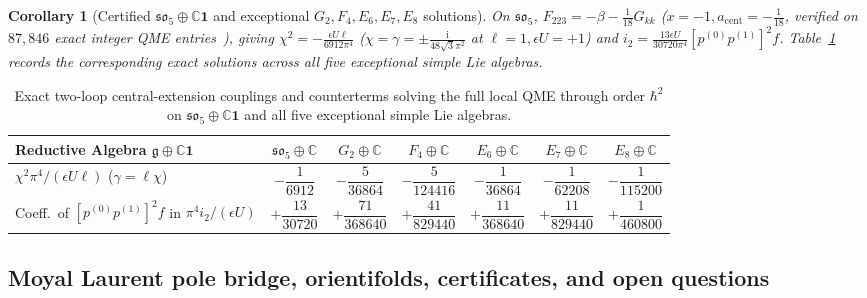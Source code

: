 \documentclass[11pt,letterpaper]{article}
\numberwithin{equation}{section}
\theoremstyle{plain}
\newtheorem{corollary}[theorem]{Corollary}
\theoremstyle{definition}
\theoremstyle{remark}
\newcommand{\ii}{\mathrm{i}}
\newcommand{\fg}{\mathfrak{g}}
\newcommand{\fso}{\mathfrak{so}}
\begin{document}
\begin{corollary}[Certified $\fso_5\oplus\mathbb{C}\mathbf{1}$ and exceptional $G_2, F_4, E_6, E_7, E_8$ solutions]
\label{cor:so5-central}
On $\fso_5$, $F_{223} = -\beta - \frac{1}{18}G_{kk}$ ($x = -1, a_{\mathrm{cent}} = -\frac{1}{18}$, verified on $87,846$ exact integer QME entries~\cite[\S7]{RepoAllOrders}), giving $\chi^2 = -\frac{\epsilon U\ell}{6912\pi^4}$ ($\chi = \gamma = \pm\frac{\ii}{48\sqrt{3}\pi^2}$ at $\ell=1, \epsilon U=+1$) and $i_2 = \frac{13\epsilon U}{30720\pi^4}[p^{(0)}p^{(1)}]^2 f$. Table~\ref{tab:central-exceptionals} records the corresponding exact solutions across all five exceptional simple Lie algebras.
\end{corollary}

\begin{table}[H]
\centering
\scriptsize
\setlength{\tabcolsep}{5.2pt}
\renewcommand{\arraystretch}{1.42}
\begin{tabular}{@{}lcccccc@{}}
\toprule
\textbf{Reductive Algebra $\fg\oplus\mathbb{C}\mathbf{1}$} & $\fso_5\oplus\mathbb{C}$ & $G_2\oplus\mathbb{C}$ & $F_4\oplus\mathbb{C}$ & $E_6\oplus\mathbb{C}$ & $E_7\oplus\mathbb{C}$ & $E_8\oplus\mathbb{C}$ \\
\midrule
$\chi^2\pi^4 / (\epsilon U\ell)$ ($\gamma = \ell\chi$) & $-\dfrac{1}{6912}$ & $-\dfrac{5}{36864}$ & $-\dfrac{5}{124416}$ & $-\dfrac{1}{36864}$ & $-\dfrac{1}{62208}$ & $-\dfrac{1}{115200}$ \\[5pt]
Coeff.\ of $[p^{(0)}p^{(1)}]^2 f$ in $\pi^4 i_2 / (\epsilon U)$ & $+\dfrac{13}{30720}$ & $+\dfrac{71}{368640}$ & $+\dfrac{41}{829440}$ & $+\dfrac{11}{368640}$ & $+\dfrac{11}{829440}$ & $+\dfrac{1}{460800}$ \\
\bottomrule
\end{tabular}
\caption{Exact two-loop central-extension couplings and counterterms solving the full local QME through order $\hbar^2$ on $\fso_5\oplus\mathbb{C}\mathbf{1}$ and all five exceptional simple Lie algebras.}
\label{tab:central-exceptionals}
\end{table}

\subsection{Moyal Laurent pole bridge, orientifolds, certificates, and open questions}
\label{subsec:moyal-open}
\end{document}
